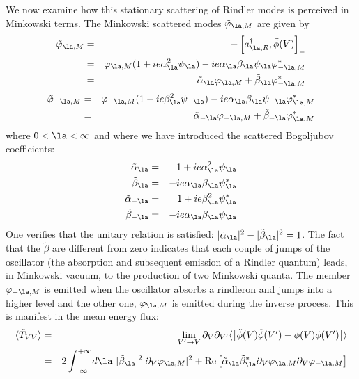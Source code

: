 We now examine how this stationary scattering of Rindler modes is
perceived in Minkowski terms.
 The Minkowski scattered modes $ \tilde \varphi_{\la,M}$ are given by
\begin{eqnarray}
 \tilde \varphi_{\la,M} &=&  - \left[ a_{\la,R}^\dagger,  \tilde \phi (V)
\right]_-
\nonumber\\ &=&
\varphi_{\la,M} (1+ie\alpha _{\la} ^2 \psi_{\la}) -ie\alpha _{\la}
\beta_{\la} \psi_{\la} \varphi_{- \la,M} ^*
\nonumber\\ &=&  \tilde  \alpha _{\la} \varphi_{\la,M} +  \tilde
\beta_{\la} \varphi_{- \la,M} ^*
\label{seize}
\end{eqnarray}
\begin{eqnarray}
\tilde \varphi_{- \la,M} &=& \varphi_{- \la,M} (1 -ie\beta_{\la}^2
\psi_{- \la}) -ie\alpha _{\la} \beta_{\la} \psi_{- \la} \varphi_{ \la,M}
^* \nonumber\\ &=&  \tilde  \alpha _{- \la} \varphi_{- \la,M} +  \tilde
\beta_{- \la} \varphi_{\la,M} ^*
\label{dsept}
\end{eqnarray}
where $ 0 < \la < \infty $ and where we have introduced the scattered
Bogoljubov coefficients:
\begin{eqnarray}
 \tilde  \alpha _{\la} &=&  1+ie\alpha _{\la} ^2 \psi_{\la}
\nonumber\\
 \tilde
\beta_{\la} &=& -ie\alpha _{\la}
\beta_{\la} \psi^*_{\la}
\nonumber\\
\tilde  \alpha _{- \la} &=& 1 +ie\beta_{\la}^2
\psi^*_{\la}
\nonumber\\
\tilde
\beta_{- \la} &=& -ie\alpha _{\la} \beta_{\la} \psi_{\la}
\label{dhuit}
\end{eqnarray}
One verifies that the unitary relation is satisfied:
$| \tilde \alpha_{\la}|^2-| \tilde \beta_{\la}|^2=1$.
 The fact that the $ \tilde \beta $ are different from zero indicates
that each couple of jumps of the oscillator
(the absorption and subsequent emission of a Rindler quantum)
leads, in Minkowski vacuum, to the production of two Minkowski quanta.
The member $ \varphi_{- \la , M}$ is emitted when the oscillator
absorbs a rindleron and jumps into a higher level and the other one,
$ \varphi_{ \la , M}$ is emitted during the inverse process.
This is
manifest
in the mean energy flux:
\begin{eqnarray}
\bk{\tilde T_{VV}} &=&  \lim_{V^\prime
\rightarrow V}\partial_V \partial_{V^\prime} \bk{\left[ \tilde \phi(V)
\tilde \phi(V^\prime) -
\phi(V) \phi(V^\prime) \right]}
\nonumber\\ &=& 2  \int_{-\infty}^{+\infty} \! d\la\  | \tilde \beta_{\la}|^2
| \partial_V \varphi_{\la,M}|^2 +
\mbox{Re} \left[ \tilde  \alpha
_{\la} \tilde \beta_{\la}^*
\partial_V \varphi_{\la,M} \partial_V \varphi_{- \la,M} \right]
\label{dneuf}
\end{eqnarray}
